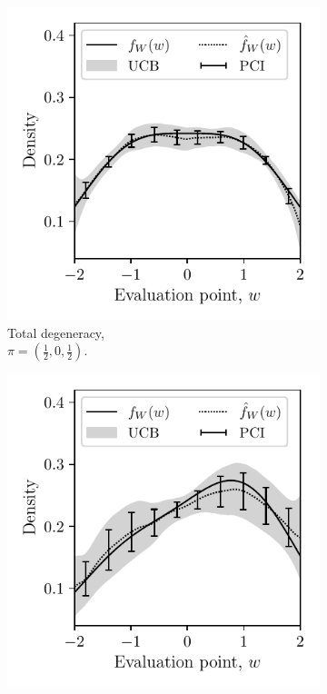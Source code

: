 \begin{figure}[ht]
  \centering
  \begin{subfigure}{0.32\textwidth}
    \centering
    \includegraphics[scale=0.64]{graphics/outcome_plot_total.pdf}
    \caption{Total degeneracy, \\
    $\pi = \left( \frac{1}{2}, 0, \frac{1}{2} \right)$.}
  \end{subfigure}
  \begin{subfigure}{0.32\textwidth}
    \centering
    \includegraphics[scale=0.64]{graphics/outcome_plot_partial.pdf}

\end{subfigure}
\end{figure}
